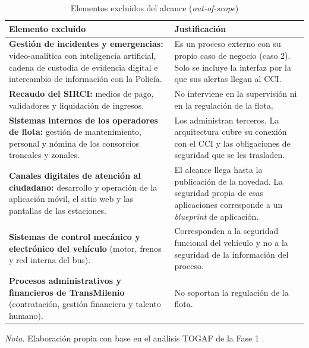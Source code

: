 \begin{table}[H]
	\caption{Elementos excluidos del alcance (\textit{out-of-scope})}
	\label{tab:alcance-excluido}
	\centering
	\footnotesize
	\renewcommand{\arraystretch}{1.15}
	\begin{tabularx}{\textwidth}{@{}>{\raggedright\arraybackslash}p{} Y@{}}
		\toprule
		\textbf{Elemento excluido} & \textbf{Justificación}                                                                                                                           \\
		\midrule
		\textbf{Gestión de incidentes y emergencias:} video-analítica con inteligencia artificial, cadena de custodia de evidencia digital e intercambio de información con la Policía.
		                           & Es un proceso externo con su propio caso de negocio (caso 2). Solo se incluye la interfaz por la que sus alertas llegan al CCI.
		\\
		\midrule
		\textbf{Recaudo del SIRCI:} medios de pago, validadores y liquidación de ingresos.
		                           & No interviene en la supervisión ni en la regulación de la flota.
		\\
		\midrule
		\textbf{Sistemas internos de los operadores de flota:} gestión de mantenimiento, personal y nómina de los consorcios troncales y zonales.
		                           & Los administran terceros. La arquitectura cubre su conexión con el CCI y las obligaciones de seguridad que se les trasladen.
		\\
		\midrule
		\textbf{Canales digitales de atención al ciudadano:} desarrollo y operación de la aplicación móvil, el sitio web y las pantallas de las estaciones.
		                           & El alcance llega hasta la publicación de la novedad. La seguridad propia de esas aplicaciones corresponde a un \textit{blueprint} de aplicación.
		\\
		\midrule
		\textbf{Sistemas de control mecánico y electrónico del vehículo} (motor, frenos y red interna del bus).
		                           & Corresponden a la seguridad funcional del vehículo y no a la seguridad de la información del proceso.
		\\
		\midrule
		\textbf{Procesos administrativos y financieros de TransMilenio} (contratación, gestión financiera y talento humano).
		                           & No soportan la regulación de la flota.
		\\
		\bottomrule
	\end{tabularx}

	\vspace{0.4em}
	\parbox{\textwidth}{\footnotesize \textit{Nota.} Elaboración propia con base en el análisis TOGAF de la Fase 1 \parencite{fase1cci2026}.}
\end{table}

